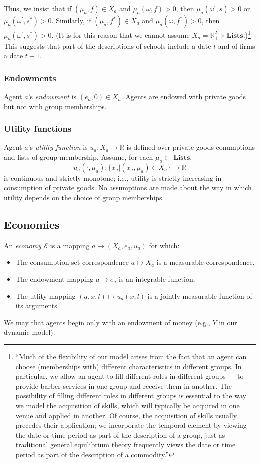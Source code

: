 \documentclass[12pt,letterpaper]{article}
\begin{document}
	Thus, we insist that if $(\mu_a,f)\in X_a$ and $\mu_a(\omega,f)>0$, then $\mu_a(\omega^\prime,s)>0$ or  $\mu_a(\omega^\prime,s^\ast)>0$.
	Similarly, if $(\mu_a,f^\ast)\in X_a$ and $\mu_a(\omega,f^\ast)>0$, then $\mu_a(\omega^\prime,s^\ast)>0$.
	(It is for this reason that we cannot assume $X_a=\mathbb{R}^2_+\times\textbf{Lists}$.)\footnote
	{
		``Much of the ﬂexibility of our model arises from the fact that an agent can choose (memberships with) different characteristics in different groups. In particular, we allow an agent to ﬁll different roles in different groups — to provide barber services in one group and receive them in another. The possibility of ﬁlling different roles in different groups is essential to the way we model the acquisition of skills, which will typically be acquired in one venue and applied in another. Of course, the acquisition of skills usually precedes their application; we incorporate the temporal element by viewing the date or time period as part of the description of a group, just as traditional general equilibrium theory frequently views the date or time period as part of the description of a commodity.''
	}
	This suggests that part of the descriptions of schools include a date $t$ and of firms a date $t+1$.
	
	\subsubsection{Endowments}
	Agent $a$'s \textit{endowment} is $(e_a,0)\in X_a$. 
	Agents are endowed with private goods but not with group memberships.

	\subsubsection{Utility functions}
	Agent $a$'s \textit{utility function} is $u_a:X_a\rightarrow \mathbb{R}$ is defined over private goods conumptions and lists of group membership.
	Assume, for each $\mu_a\in\textbf{ Lists}$,
	\[
	 u_a(\cdot,\mu_a):\{x_a|(x_a,\mu_a)\in X_a\}\rightarrow \mathbb{R}
	 \]
	 is continuous and strictly monotone; i.e., utility is strictly increasing in consumption of private goods.
	 No assumptions are made about the way in which utility depends on the choice of group memberships.
	 
	 \subsection{Economies}
	 An \textit{economy} $\mathcal{E}$ is a mapping $a\mapsto(X_a,e_a,u_a)$ for which:
	 \begin{itemize}
	 	\item The consumption set correspondence $a\mapsto X_a$ is a measurable correspondence.
	 	\item The endowment mapping $a\mapsto e_a$ is an integrable function.
	 	\item The utlity mapping $(a,x,l)\mapsto u_a(x,l)$ is a jointly measurable function of its arguments.
	 \end{itemize}
	 We may  that agents begin only with an endowment of money (e.g., $Y$ in our dynamic model).
	 
\end{document}
